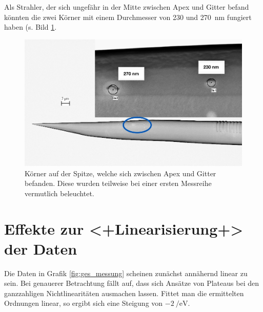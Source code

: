 \documentclass[bachelor,       %
               twoside,        %
               BCOR10mm,       %
               english,ngerman, %
               ]{GAUBM}
\begin{document}
Als Strahler, der sich ungefähr in der Mitte zwischen Apex und Gitter befand könnten die zwei Körner mit einem Durchmesser von 230 und \SI{270}{\nm} fungiert haben (s. Bild \ref{fig:hotspots}.

\begin{figure}[h]
	\centering
	\includegraphics[width=0.8\linewidth]{Hotspots}
	\caption{Körner auf der Spitze, welche sich zwischen Apex und Gitter befanden. Diese wurden teilweise bei einer ersten Messreihe vermutlich beleuchtet.}
	\label{fig:hotspots}
\end{figure}



\section{Effekte zur <+Linearisierung+> der Daten}
\label{sec:erklaerung_lin}
Die Daten in Grafik \ref{fig:ges_messung} scheinen zunächst annähernd linear zu sein.
Bei genauerer Betrachtung fällt auf, dass sich Ansätze von Plateaus bei den ganzzahligen Nichtlinearitäten ausmachen lassen.
Fittet man die ermittelten Ordnungen linear, so ergibt sich eine Steigung von $\SI{-2}{\per\eV}$.
\end{document}
